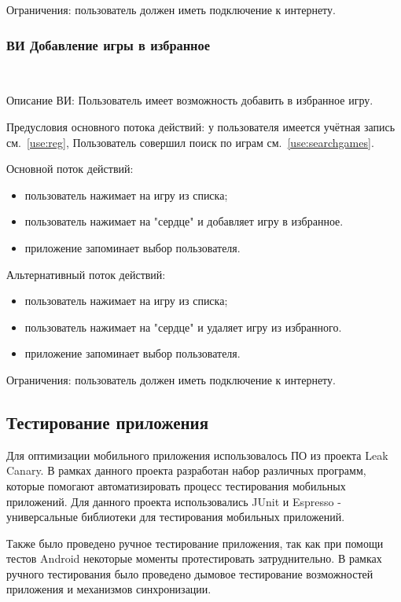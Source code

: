 Ограничения: пользователь должен иметь подключение к интернету.

\subsubsection{ВИ Добавление игры в избранное}~\par
\label{use:favoritegames}
Описание ВИ: Пользователь имеет возможность добавить в избранное игру.
 
Предусловия основного потока действий: у пользователя имеется учётная запись см.~\ref{use:reg}, Пользователь совершил поиск по играм см.~\ref{use:searchgames}.
 
Основной поток действий:
\begin{itemize}
   \item пользователь нажимает на игру из списка;
   \item пользователь нажимает на "сердце" и добавляет игру в избранное.
   \item приложение запоминает выбор пользователя.
\end{itemize}

Альтернативный поток действий:
\begin{itemize}
   \item пользователь нажимает на игру из списка;
   \item пользователь нажимает на "сердце" и удаляет игру из избранного.
   \item приложение запоминает выбор пользователя.
\end{itemize}

Ограничения: пользователь должен иметь подключение к интернету.

\subsection{Тестирование приложения}
Для оптимизации мобильного приложения использовалось ПО из проекта Leak Canary. В рамках данного проекта разработан набор различных программ, которые помогают автоматизировать процесс тестирования мобильных приложений. Для данного проекта использовались JUnit и Espresso - универсальные библиотеки для тестирования мобильных приложений.
 
Также было проведено ручное тестирование приложения, так как при помощи тестов Android некоторые моменты протестировать затруднительно. В рамках ручного тестирования было проведено дымовое тестирование возможностей приложения и механизмов синхронизации.


